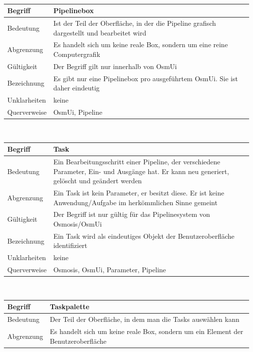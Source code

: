 \documentclass[a4paper,12pt]{scrartcl}
\begin{document}
\begin{center}
\begin{tabular}{|p{5cm}|p{10cm}|}
\hline 
\end{tabular}
\vspace{0.7cm}
\\
\begin{tabular}{|p{5cm}|p{10cm}|}
\hline Begriff & \textbf{Pipelinebox} \\ 
\hline Bedeutung & Ist der Teil der Oberfläche, in der die Pipeline grafisch dargestellt und bearbeitet wird \\ 
\hline Abgrenzung & Es handelt sich um keine reale Box, sondern um eine reine Computergrafik \\ 
\hline Gültigkeit & Der Begriff gilt nur innerhalb von OsmUi \\ 
\hline Bezeichnung & Es gibt nur eine Pipelinebox pro ausgeführtem OsmUi. Sie ist daher eindeutig \\ 
\hline Unklarheiten & keine \\ 
\hline Querverweise & OsmUi, Pipeline \\ 
\hline 
\end{tabular}
\vspace{0.7cm}
\\
\begin{tabular}{|p{5cm}|p{10cm}|}
\hline Begriff & \textbf{Task} \\ 
\hline Bedeutung & Ein Bearbeitungsschritt einer Pipeline, der verschiedene Parameter, Ein- und Ausgänge hat. Er kann neu generiert, gelöscht und geändert werden\\ 
\hline Abgrenzung & Ein Task ist kein Parameter, er besitzt diese. Er ist keine Anwendung/Aufgabe im herkömmlichen Sinne gemeint\\ 
\hline Gültigkeit & Der Begriff ist nur gültig für das Pipelinesystem von Osmosis/OsmUi\\ 
\hline Bezeichnung & Ein Task wird als eindeutiges Objekt der Benutzeroberfläche identifiziert\\ 
\hline Unklarheiten & keine \\ 
\hline Querverweise & Osmosis, OsmUi, Parameter, Pipeline\\ 
\hline 
\end{tabular}
\vspace{0.7cm}
\\
\begin{tabular}{|p{5cm}|p{10cm}|}
\hline Begriff & \textbf{Taskpalette} \\ 
\hline Bedeutung & Der Teil der Oberfläche, in dem man die Tasks auswählen kann  \\ 
\hline Abgrenzung & Es handelt sich um keine reale Box, sondern um ein Element der Benutzeroberfläche\\ 

\end{tabular}
\end{center}
\end{document}
